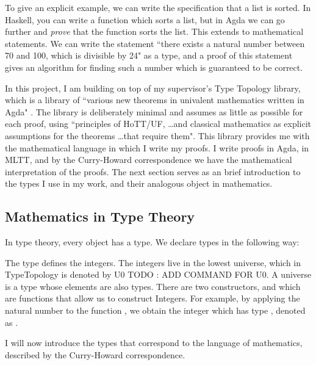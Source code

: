 \documentclass[ProjectReport]{subfiles}
\begin{document}
To give an explicit example, we can write the specification that a list is sorted. In Haskell, you can write a function which sorts a list, but in Agda we can go further and \textit{prove} that the function sorts the list. This extends to mathematical statements. We can write the statement ``there exists a natural number between 70 and 100, which is divisible by 24" as a type, and a proof of this statement gives an algorithm for finding such a number which is guaranteed to be correct.

In this project, I am building on top of my supervisor's Type Topology library, which is a library of ``various new theorems in univalent mathematics written in Agda" \cite{TypeTopology}. The library is deliberately minimal and assumes as little as possible for each proof, using ``principles of HoTT/UF, \ldots and classical mathematics as explicit assumptions for the theorems \ldots that require them". This library provides me with the mathematical language in which I write my proofs. I write proofs in Agda, in MLTT, and by the Curry-Howard correspondence we have the mathematical interpretation of the proofs.  The next section serves as an brief introduction to the types I use in my work, and their analogous object in mathematics.

\subsection{Mathematics in Type Theory}

In type theory, every object has a type. We declare types in the following way:

\TypeExample

The type  defines the integers. The integers live in the lowest universe, which in TypeTopology is denoted by U0 {TODO : ADD COMMAND FOR U0}. A universe is a type whose elements are also types. There are two constructors,  and  which are functions that allow us to construct Integers. For example, by applying the natural number  to the function , we obtain the integer \AgdaSpace{} which has type , denoted as
\AgdaSpace{}%
\AgdaSymbol{:}\AgdaSpace{}%
.

I will now introduce the types that correspond to the language of mathematics, described by the Curry-Howard correspondence. 
\end{document}
